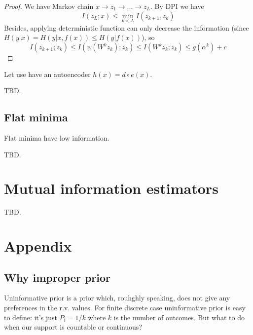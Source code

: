 \documentclass{article}
\begin{document}
\begin{proof}
We have Markov chain $x \to z_1 \to ... \to z_L$.
By DPI we have
\[
I(z_L;x) \leq \min_{k < L} I(z_{k+1}, z_k)
\]
Besides, applying deterministic function can only decrease the information (since $H(y|x) = H(y|x, f(x)) \leq H(y | f(x))$), so
\[
I(z_{k+1}; z_k) \leq I(\psi(W^k z_k); z_k) \leq I(W^k z_k; z_k) \leq g(\alpha^k) + c
\]
\end{proof}


\begin{theorem}
Let use have an autoencoder $h(x) = d \circ e(x)$.
\end{theorem}
TBD.

\subsection*{Flat minima}
\begin{theorem}
Flat minima have low information.
\end{theorem}
TBD.

\section{Mutual information estimators}
TBD.
%
%
%

\section{Appendix}
\subsection*{Why improper prior}
Uninformative prior is a prior which, rouhghly speaking, does not give any preferences in the r.v. values.
For finite discrete case uninformative prior is easy to define: it's just $P_i = 1/k$ where $k$ is the number of outcomes.
But what to do when our support is countable or continuous?
\end{document}

